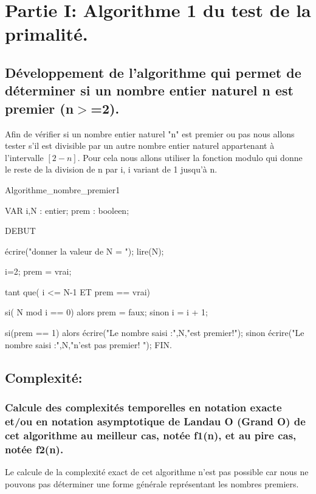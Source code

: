 \documentclass[12pt]{article}
\begin{document}
\def\reportnumber{2}
\def\reporttitle{Algorithmes de Complexités temporelles linéaire O(n) et racine carrée O($\sqrt{n}$).}


\section{Partie I: Algorithme 1 du test de la primalité.}

\subsection{Développement de l'algorithme qui permet de déterminer  si un nombre entier naturel n est premier (n$>$=2). }
Afin de vérifier si un nombre entier naturel "n" est premier ou pas nous allons tester s'il est divisible par un autre nombre entier naturel appartenant à l'intervalle $[2 - n]$.
Pour cela nous allons utiliser la fonction modulo qui donne le reste de la division de n par i, i variant de 1 jusqu'à n.


\begin{sql}

 Algorithme_nombre_premier1

 VAR
 i,N : entier;
 prem : booleen;
 
 DEBUT
 
	écrire("donner la valeur de N = ");
	lire(N);

	i=2;
	prem = vrai;

	tant que( i <= N-1 ET prem == vrai){

		si( N mod i == 0)
			alors 
				prem = faux;				
			sinon
				i = i + 1;
	}

	si(prem == 1)
    	alors
        	écrire("Le nombre saisi :",N,"est premier!");
    	sinon
        	écrire("Le nombre saisi :",N,"n'est pas premier! ");
 FIN. 
 
\end{sql}

\subsection{Complexité:}

\subsubsection{Calcule des complexités temporelles en notation exacte et/ou en notation asymptotique de Landau O (Grand O) de  cet  algorithme au meilleur cas, notée f1(n), et au pire cas, notée f2(n). }
Le calcule de la complexité exact de cet algorithme n'est pas possible car nous ne pouvons pas déterminer une forme générale représentant les nombres premiers.
 
\end{document}
